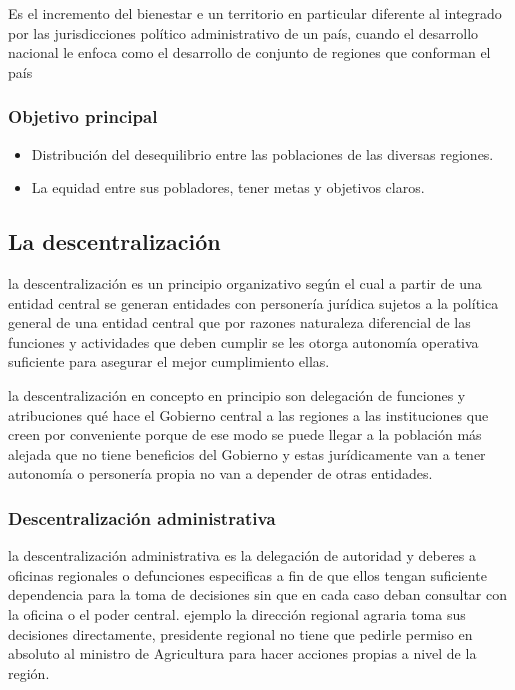 \documentclass[
  letterpaper,
  DIV=11,
  numbers=noendperiod]{scrartcl}
\providecommand{\tightlist}{%
  \setlength{\itemsep}{0pt}\setlength{\parskip}{0pt}}\usepackage{longtable,booktabs,array}
\begin{document}
Es el incremento del bienestar e un territorio en particular diferente
al integrado por las jurisdicciones político administrativo de un país,
cuando el desarrollo nacional le enfoca como el desarrollo de conjunto
de regiones que conforman el país

\hypertarget{objetivo-principal}{%
\subsubsection{Objetivo principal}\label{objetivo-principal}}

\begin{itemize}
\tightlist
\item
  Distribución del desequilibrio entre las poblaciones de las diversas
  regiones.
\item
  La equidad entre sus pobladores, tener metas y objetivos claros.
\end{itemize}

\hypertarget{la-descentralizaciuxf3n-1}{%
\subsection{La descentralización}\label{la-descentralizaciuxf3n-1}}

la descentralización es un principio organizativo según el cual a partir
de una entidad central se generan entidades con personería jurídica
sujetos a la política general de una entidad central que por razones
naturaleza diferencial de las funciones y actividades que deben cumplir
se les otorga autonomía operativa suficiente para asegurar el mejor
cumplimiento ellas.

la descentralización en concepto en principio son delegación de
funciones y atribuciones qué hace el Gobierno central a las regiones a
las instituciones que creen por conveniente porque de ese modo se puede
llegar a la población más alejada que no tiene beneficios del Gobierno y
estas jurídicamente van a tener autonomía o personería propia no van a
depender de otras entidades.

\hypertarget{descentralizaciuxf3n-administrativa}{%
\subsubsection{Descentralización
administrativa}\label{descentralizaciuxf3n-administrativa}}

la descentralización administrativa es la delegación de autoridad y
deberes a oficinas regionales o defunciones especificas a fin de que
ellos tengan suficiente dependencia para la toma de decisiones sin que
en cada caso deban consultar con la oficina o el poder central. ejemplo
la dirección regional agraria toma sus decisiones directamente,
presidente regional no tiene que pedirle permiso en absoluto al ministro
de Agricultura para hacer acciones propias a nivel de la región.
\end{document}

